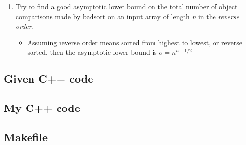 \begin{enumerate}
\begin{enumerate}
\begin{enumerate}
    \item Try to find a good asymptotic lower bound on the total number of object comparisons made by badsort on an input array of length \emph{n} in the \emph{reverse order}.
      \begin{itemize}
      \item Assuming reverse order means sorted from highest to lowest, or reverse sorted, then the asymptotic lower bound is $o=n^{n+1/2}$
      \end{itemize}
    \end{enumerate}
  \end{enumerate}
\end{enumerate}

\subsection{Given C++ code}

\subsection{My C++ code}

\subsection{Makefile}

